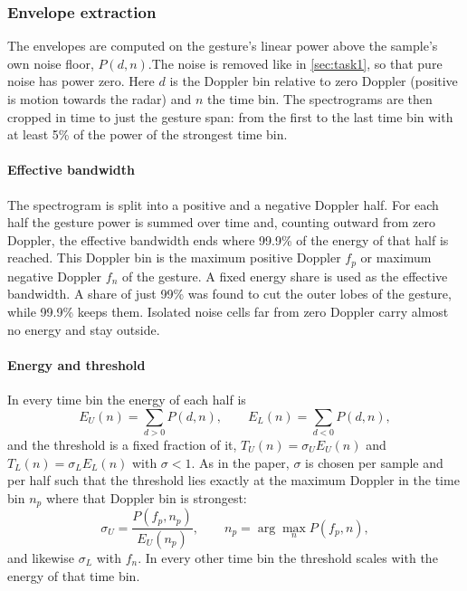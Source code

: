\documentclass[10pt,a4paper,titlepage]{article}
\begin{document}
\subsubsection{Envelope extraction}
\label{sec:envelopes}

The envelopes are computed on the gesture's linear power above the sample's own noise floor, $P(d, n)$.The noise is removed like in \autoref{sec:task1}, so that pure noise has power zero. Here $d$ is the Doppler bin relative to zero Doppler (positive is motion towards the radar) and $n$ the time bin. The spectrograms are then cropped in time to just the gesture span: from the first to the last time bin with at least 5\% of the power of the strongest time bin.

\paragraph{Effective bandwidth}
The spectrogram is split into a positive and a negative Doppler half. For each half the gesture power is summed over time and, counting outward from zero Doppler, the effective bandwidth ends where 99.9\% of the energy of that half is reached. This Doppler bin is the maximum positive Doppler $f_p$ or maximum negative Doppler $f_n$ of the gesture. A fixed energy share is used as the effective bandwidth. A share of just 99\% was found to cut the outer lobes of the gesture, while 99.9\% keeps them. Isolated noise cells far from zero Doppler carry almost no energy and stay outside.

\paragraph{Energy and threshold}
In every time bin the energy of each half is
\begin{equation}
  E_U(n) = \sum_{d > 0} P(d, n), \qquad E_L(n) = \sum_{d < 0} P(d, n),
\end{equation}
and the threshold is a fixed fraction of it, $T_U(n) = \sigma_U E_U(n)$ and $T_L(n) = \sigma_L E_L(n)$ with $\sigma < 1$. As in the paper, $\sigma$ is chosen per sample and per half such that the threshold lies exactly at the maximum Doppler in the time bin $n_p$ where that Doppler bin is strongest:
\begin{equation}
  \sigma_U = \frac{P(f_p, n_p)}{E_U(n_p)}, \qquad n_p = \arg\max_n P(f_p, n),
\end{equation}
and likewise $\sigma_L$ with $f_n$. In every other time bin the threshold scales with the energy of that time bin.
\end{document}
